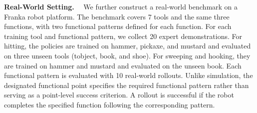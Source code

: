 


\textbf{Real-World Setting.}~~
We further construct a real-world benchmark on a Franka robot platform.
The benchmark covers 7 tools and the same three functions, with two functional patterns defined for each function.
For each training tool and functional pattern, we collect 20 expert demonstrations.
For hitting, the policies are trained on hammer, pickaxe, and mustard and evaluated on three unseen tools (tobject, book, and shoe).
For sweeping and hooking, they are trained on hammer and mustard and evaluated on the unseen book.
Each functional pattern is evaluated with 10 real-world rollouts.
Unlike simulation, the designated functional point specifies the required functional pattern rather than serving as a point-level success criterion. A rollout is successful if the robot completes the specified function following the corresponding pattern.




